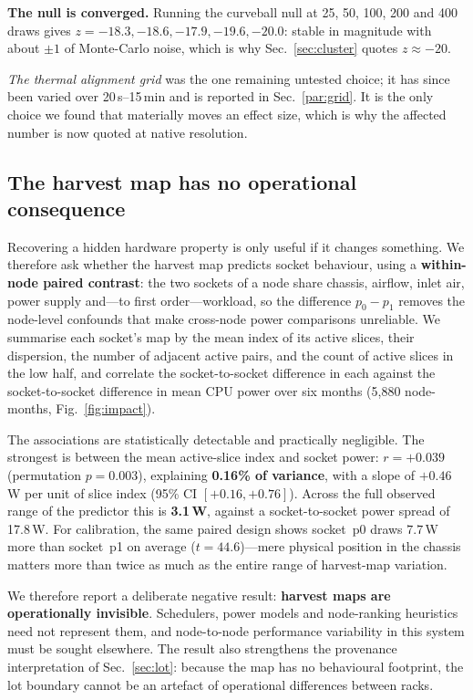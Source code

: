 \documentclass[10pt,conference]{IEEEtran}
\begin{document}
\textbf{The null is converged.} Running the curveball null at 25, 50, 100, 200 and 400 draws gives
$z = -18.3, -18.6, -17.9, -19.6, -20.0$: stable in magnitude with about $\pm1$ of Monte-Carlo
noise, which is why Sec.~\ref{sec:cluster} quotes $z\approx-20$.

\emph{The thermal alignment grid} was the one remaining untested choice; it has since been varied
over 20\,s--15\,min and is reported in Sec.~\ref{par:grid}. It is the only choice we found that
materially moves an effect size, which is why the affected number is now quoted at native
resolution.

\subsection{The harvest map has no operational consequence}
\label{sec:impact}
Recovering a hidden hardware property is only useful if it changes something. We therefore ask
whether the harvest map predicts socket behaviour, using a \textbf{within-node paired contrast}:
the two sockets of a node share chassis, airflow, inlet air, power supply and---to first
order---workload, so the difference $p_0-p_1$ removes the node-level confounds that make
cross-node power comparisons unreliable. We summarise each socket's map by the mean index of its
active slices, their dispersion, the number of adjacent active pairs, and the count of active
slices in the low half, and correlate the socket-to-socket difference in each against the
socket-to-socket difference in mean CPU power over six months (5{,}880 node-months,
Fig.~\ref{fig:impact}).

The associations are statistically detectable and practically negligible. The strongest is between
the mean active-slice index and socket power: $r=+0.039$ (permutation $p=0.003$), explaining
\textbf{0.16\% of variance}, with a slope of $+0.46$\,W per unit of slice index
(95\% CI $[+0.16,+0.76]$). Across the full observed range of the predictor this is
\textbf{3.1\,W}, against a socket-to-socket power spread of 17.8\,W. For calibration, the same
paired design shows socket~p0 draws $7.7$\,W more than socket~p1 on average ($t=44.6$)---mere
physical position in the chassis matters more than twice as much as the entire range of harvest-map
variation.

We therefore report a deliberate negative result: \textbf{harvest maps are operationally
invisible}. Schedulers, power models and node-ranking heuristics need not represent them, and
node-to-node performance variability in this system must be sought elsewhere. The result also
strengthens the provenance interpretation of Sec.~\ref{sec:lot}: because the map has no
behavioural footprint, the lot boundary cannot be an artefact of operational differences between
racks.
\end{document}
